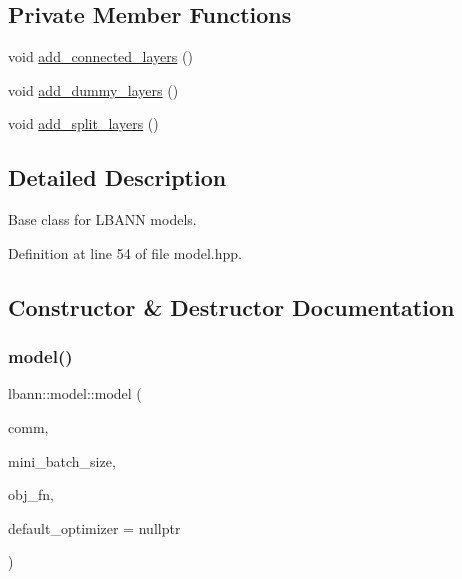 \subsection*{Private Member Functions}
\begin{DoxyCompactItemize}
\item 
void \hyperlink{classlbann_1_1model_a3fb0304e6426dd28a436f50559ef2bef}{add\+\_\+connected\+\_\+layers} ()
\item 
void \hyperlink{classlbann_1_1model_a6ba9a836e5ba52c999c5234cfa5e62c2}{add\+\_\+dummy\+\_\+layers} ()
\item 
void \hyperlink{classlbann_1_1model_ac56d43e457cd4dfc3b88122bd10d286e}{add\+\_\+split\+\_\+layers} ()
\end{DoxyCompactItemize}


\subsection{Detailed Description}
Base class for L\+B\+A\+NN models. 

Definition at line 54 of file model.\+hpp.



\subsection{Constructor \& Destructor Documentation}
\mbox{\label{classlbann_1_1model_a6feaee921c434bbfc32451ed874cc051}} 
\subsubsection{\texorpdfstring{model()}{model()}\hspace{0.1cm}{\footnotesize\ttfamily [1/2]}}
{\footnotesize\ttfamily lbann\+::model\+::model (\begin{DoxyParamCaption}\item[{\hyperlink{classlbann_1_1lbann__comm}{lbann\+\_\+comm} $\ast$}]{comm,  }\item[{int}]{mini\+\_\+batch\+\_\+size,  }\item[{\hyperlink{classlbann_1_1objective__function}{objective\+\_\+function} $\ast$}]{obj\+\_\+fn,  }\item[{\hyperlink{classlbann_1_1optimizer}{optimizer} $\ast$}]{default\+\_\+optimizer = {\ttfamily nullptr} }\end{DoxyParamCaption})}

